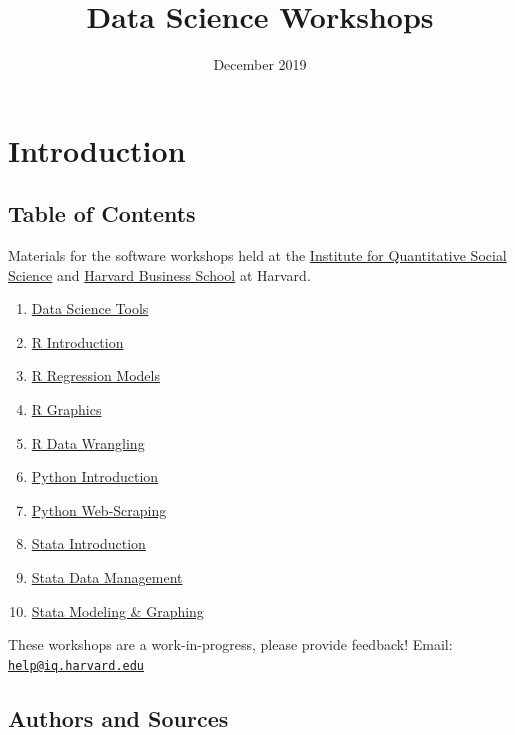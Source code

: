 \documentclass[]{book}
\title{Data Science Workshops}
\author{}
\date{December 2019}
\providecommand{\tightlist}{%
  \setlength{\itemsep}{0pt}\setlength{\parskip}{0pt}}
\begin{document}
\maketitle

{
\setcounter{tocdepth}{1}
\tableofcontents
}
\hypertarget{introduction}{%
\chapter*{Introduction}\label{introduction}}

\hypertarget{table-of-contents}{%
\section*{Table of Contents}\label{table-of-contents}}

Materials for the software workshops held at the \href{http://iq.harvard.edu}{Institute for Quantitative Social Science} and \href{https://training.rcs.hbs.org}{Harvard Business School} at Harvard.

\begin{enumerate}
\def\labelenumi{\arabic{enumi}.}
\tightlist
\item
  \href{./DataScienceTools.html}{Data Science Tools}
\item
  \href{./Rintro.html}{R Introduction}
\item
  \href{./Rmodels.html}{R Regression Models}
\item
  \href{./Rgraphics.html}{R Graphics}
\item
  \href{./RDataWrangling.html}{R Data Wrangling}
\item
  \href{./PythonIntro.html}{Python Introduction}
\item
  \href{./PythonWebScrape.html}{Python Web-Scraping}
\item
  \href{./StataIntro.html}{Stata Introduction}
\item
  \href{./StataDatMan.html}{Stata Data Management}
\item
  \href{./StataModGraph.html}{Stata Modeling \& Graphing}
\end{enumerate}

These workshops are a work-in-progress, please provide feedback! Email: \href{mailto:help@iq.harvard.edu}{\nolinkurl{help@iq.harvard.edu}}

\hypertarget{authors-and-sources}{%
\section*{Authors and Sources}\label{authors-and-sources}}
\end{document}
